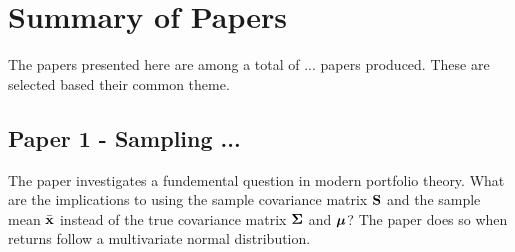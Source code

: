 \documentclass[]{book}\usepackage{knitr}
\begin{document}
\chapter{Summary of Papers}\label{ch:papersummary}

The papers presented here are among a total of ... papers produced. These are selected based their common theme.
\section*{Paper 1 - Sampling ...}
The paper investigates a fundemental question in modern portfolio theory. 
What are the implications to using the sample covariance matrix $\mathbf{S}$ and the sample mean $\bar{\mathbf{x}}$ instead of the true covariance matrix $\mathbf{\Sigma}$ and $\mbox{\boldmath$\mu$}$?
The paper does so when returns follow a multivariate normal distribution.
\end{document}
